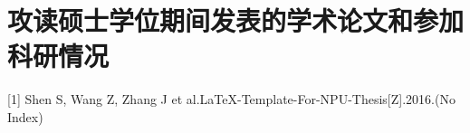\chapter*{攻读硕士学位期间发表的学术论文和参加科研情况}

[1]	Shen S, Wang Z, Zhang J et al.{{\LaTeX}}-Template-For-NPU-Thesis[Z].2016.(No Index)

\clearpage
\endinput